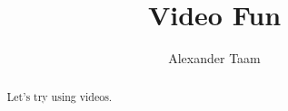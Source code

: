 \documentclass{ximera}
\title{Video Fun}
\author{Alexander Taam}
\begin{document}
\begin{abstract}
  Let's try using videos.
\end{abstract}
\maketitle

\begin{center} %
\begin{foldable}
\end{foldable}
\end{center}
\end{document}
